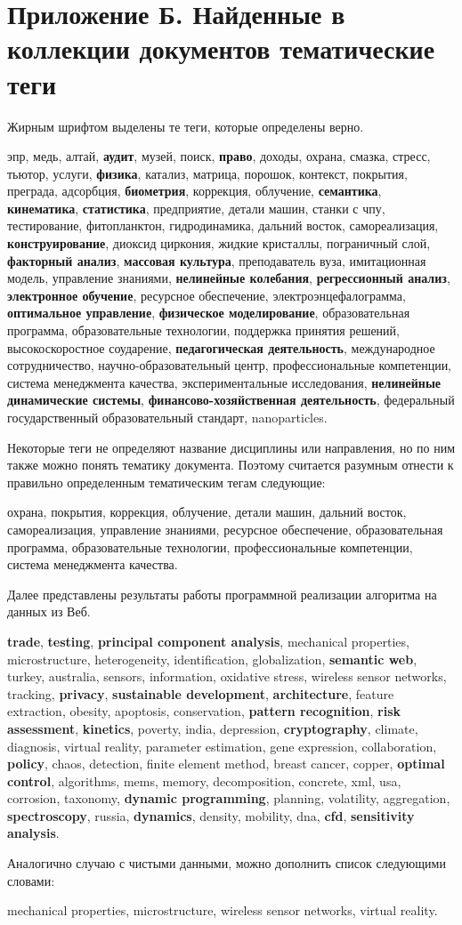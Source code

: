 \chapter{Приложение Б. Найденные в коллекции документов тематические теги} \label{AppendixB}
Жирным шрифтом выделены те теги, которые определены верно.

эпр, медь, алтай, \textbf{аудит}, музей, поиск, \textbf{право}, доходы, охрана, смазка, стресс, тьютор, услуги, \textbf{физика}, катализ, матрица, порошок, контекст, покрытия, преграда, адсорбция, \textbf{биометрия}, коррекция, облучение, \textbf{семантика}, \textbf{кинематика}, \textbf{статистика}, предприятие, детали машин, станки с чпу, тестирование, фитопланктон, гидродинамика, дальний восток, самореализация, \textbf{конструирование}, диоксид циркония, жидкие кристаллы, пограничный слой, \textbf{факторный анализ}, \textbf{массовая культура}, преподаватель вуза, имитационная модель, управление знаниями, \textbf{нелинейные колебания}, \textbf{регрессионный анализ}, \textbf{электронное обучение}, ресурсное обеспечение, электроэнцефалограмма, \textbf{оптимальное управление}, \textbf{физическое моделирование}, образовательная программа, образовательные технологии, поддержка принятия решений, высокоскоростное соударение, \textbf{педагогическая деятельность}, международное сотрудничество, научно-образовательный центр, профессиональные компетенции, система менеджмента качества, экспериментальные исследования, \textbf{нелинейные динамические системы}, \textbf{финансово-хозяйственная деятельность}, федеральный государственный образовательный стандарт, nanoparticles.

Некоторые теги не определяют название дисциплины или направления, но по ним также можно понять тематику документа. Поэтому считается разумным отнести к правильно определенным тематическим тегам следующие:

охрана, покрытия, коррекция, облучение, детали машин, дальний восток, самореализация, управление знаниями, ресурсное обеспечение, образовательная программа, образовательные технологии, профессиональные компетенции, система менеджмента качества.

Далее представлены результаты работы программной реализации алгоритма на данных из Веб.

\textbf{trade}, \textbf{testing}, \textbf{principal component analysis}, mechanical properties, microstructure, heterogeneity, identification, globalization, \textbf{semantic web}, turkey, australia, sensors, information, oxidative stress, wireless sensor networks, tracking, \textbf{privacy}, \textbf{sustainable development}, \textbf{architecture}, feature extraction, obesity, apoptosis, conservation, \textbf{pattern recognition}, \textbf{risk assessment}, \textbf{kinetics}, poverty, india, depression, \textbf{cryptography}, climate, diagnosis, virtual reality, parameter estimation, gene expression, collaboration, \textbf{policy}, chaos, detection, finite element method, breast cancer, copper, \textbf{optimal control}, algorithms, mems, memory, decomposition, concrete, xml, usa, corrosion, taxonomy, \textbf{dynamic programming}, planning, volatility, aggregation, \textbf{spectroscopy}, russia, \textbf{dynamics}, density, mobility, dna, \textbf{cfd}, \textbf{sensitivity analysis}.

Аналогично случаю с чистыми данными, можно дополнить список следующими словами:

mechanical properties, microstructure, wireless sensor networks, virtual reality.
